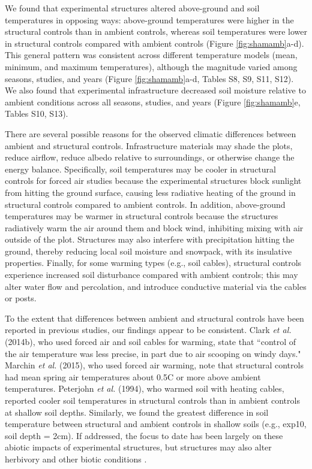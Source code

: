 \documentclass{article}
\begin{document}
\par We found that experimental structures altered above-ground and soil temperatures in opposing ways: above-ground temperatures were higher in the structural controls than in ambient controls, whereas soil temperatures were lower in structural controls compared with ambient controls (Figure \ref{fig:shamamb}a-d). This general pattern was consistent across different temperature models (mean, minimum, and maximum temperatures), although the magnitude varied among seasons, studies, and years (Figure \ref{fig:shamamb}a-d, Tables S8, S9, S11, S12). We also found that experimental infrastructure decreased soil moisture relative to ambient conditions across all seasons, studies, and years (Figure \ref{fig:shamamb}e, Tables S10, S13). 
\par There are several possible reasons for the observed climatic differences between ambient and structural controls. Infrastructure materials may shade the plots, reduce airflow, reduce albedo relative to surroundings, or otherwise change the energy balance. Specifically, soil temperatures may be cooler in structural controls for forced air studies because the experimental structures block sunlight from hitting the ground surface, causing less radiative heating of the ground in structural controls compared to ambient controls. In addition, above-ground temperatures may be warmer in structural controls because the structures radiatively warm the air around them and block wind, inhibiting mixing with air outside of the plot. Structures may also interfere with precipitation hitting the ground, thereby reducing local soil moisture and snowpack, with its insulative properties. Finally, for some warming types (e.g., soil cables), structural controls experience increased soil disturbance compared with ambient controls; this may alter water flow and percolation, and introduce conductive material via the cables or posts. 

\par To the extent that differences between ambient and structural controls have been reported in previous studies, our findings appear to be consistent. Clark \textit{et al.} (2014b), who used forced air and soil cables for warming, state that ``control of the air temperature was less precise, in part due to air scooping on windy days." Marchin \textit{et al.} (2015), who used forced air warming, note that structural controls had mean spring air temperatures about 0.5\degree C or more above ambient temperatures. Peterjohn \textit{et al.} (1994), who warmed soil with heating cables, reported cooler soil temperatures in structural controls than in ambient controls at shallow soil depths. Similarly, we found the greatest difference in soil temperature between structural and ambient controls in shallow soils (e.g., exp10, soil depth = 2cm). If addressed, the focus to date has been largely on these abiotic impacts of experimental structures, but structures may also alter herbivory and other biotic conditions \citep{kennedy1995,moise2010,wolkovich2012,hoeppner2012}. 
\end{document}
